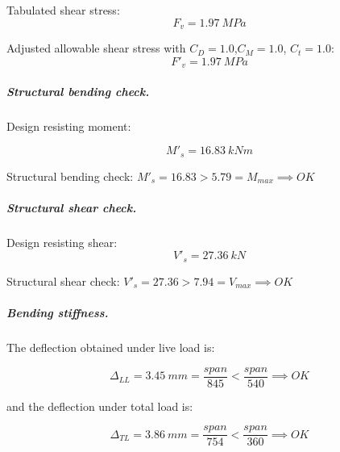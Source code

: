 \noindent Tabulated shear stress:
\begin{equation}
  F_v= 1.97\ MPa
\end{equation}

\noindent Adjusted allowable shear stress with $C_D= 1.0$,$C_M= 1.0$, $C_t= 1.0$:
\begin{equation}
  F'_v= 1.97\ MPa
\end{equation}

\subparagraph{Structural bending check.}

\noindent Design resisting moment:

\begin{equation}
  M'_s= 16.83\ kN m
\end{equation}

\noindent Structural bending check: $M'_s = 16.83 > 5.79 = M_{max} \implies OK$

\subparagraph{Structural shear check.}

\noindent Design resisting shear:
\begin{equation}
  V'_s= 27.36\ kN
\end{equation}

\noindent Structural shear check: $V'_s = 27.36 > 7.94 = V_{max} \implies OK$

\subparagraph{Bending stiffness.}
The deflection obtained under live load is:

\begin{equation}
  \Delta_{LL}= 3.45\ mm= \frac{span}{845} < \frac{span}{540} \implies OK
\end{equation}

\noindent and the deflection under total load is:

\begin{equation}
  \Delta_{TL}= 3.86\ mm= \frac{span}{754} < \frac{span}{360} \implies OK
\end{equation}

